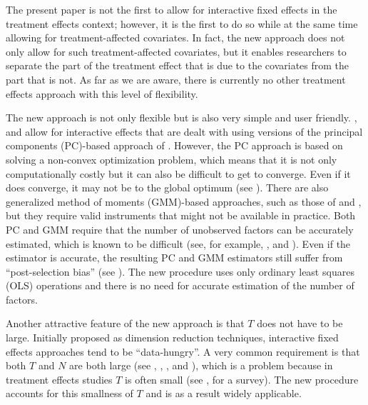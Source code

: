 \documentclass[12pt,fleqn]{article}
\begin{document}
  The present paper is not the first to allow for interactive fixed effects in the treatment effects context; however, it is the first to do so while at the same time allowing for treatment-affected covariates. In fact, the new approach does not only allow for such treatment-affected covariates, but it enables researchers to separate the part of the treatment effect that is due to the covariates from the part that is not. As far as we are aware, there is currently no other treatment effects approach with this level of flexibility.
  
  The new approach is not only flexible but is also very simple and user friendly. \citet{Gobillon_Magnac_2016}, and \citet{Xu_2017} allow for interactive effects that are dealt with using versions of the principal components (PC)-based approach of \citet{bai2009panel}. However, the PC approach is based on solving a non-convex optimization problem, which means that it is not only computationally costly but it can also be difficult to get to converge. Even if it does converge, it may not be to the global optimum (see \citealp{Moon_Weidner_2019}). There are also generalized method of moments (GMM)-based approaches, such as those of \citet{Callaway_Karami_2020} and \citet{brown2022generalized}, but they require valid instruments that might not be available in practice. Both PC and GMM require that the number of unobserved factors can be accurately estimated, which is known to be difficult (see, for example, \citealp{moon2015linear}, and \citealp{breitung2021alternative}). Even if the estimator is accurate, the resulting PC and GMM estimators still suffer from ``post-selection bias'' (see \citealp{leeb2005model}). The new procedure uses only ordinary least squares (OLS) operations and there is no need for accurate estimation of the number of factors.
  
  Another attractive feature of the new approach is that $T$ does not have to be large. Initially proposed as dimension reduction techniques, interactive fixed effects approaches tend to be ``data-hungry''. A very common requirement is that both $T$ and $N$ are both large (see \citealp{chan2022pcdid}, \citealp{Gobillon_Magnac_2016}, \citealp{Xu_2017}, and \citealp{Arkhangelsky_2021_synthetic_DID}), which is a problem because in treatment effects studies $T$ is often small (see \citealp{Bertrand_etal_2004}, for a survey). The new procedure accounts for this smallness of $T$ and is as a result widely applicable.
  
\end{document}
